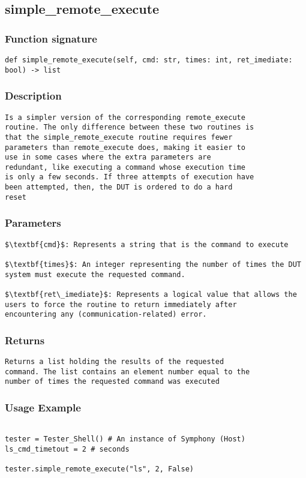 \subsection{simple\_remote\_execute}

\subsubsection{Function signature}
\begin{lstlisting}
def simple_remote_execute(self, cmd: str, times: int, ret_imediate: bool) -> list
\end{lstlisting}

\subsubsection{Description}
\begin{lstlisting}[mathescape=true, keywordstyle=\color{black}, showstringspaces=false]
Is a simpler version of the corresponding remote_execute 
routine. The only difference between these two routines is 
that the simple_remote_execute routine requires fewer 
parameters than remote_execute does, making it easier to 
use in some cases where the extra parameters are 
redundant, like executing a command whose execution time 
is only a few seconds. If three attempts of execution have 
been attempted, then, the DUT is ordered to do a hard 
reset
\end{lstlisting}

\subsubsection{Parameters}
\begin{lstlisting}[mathescape=true, keywordstyle=\color{black}]
$\textbf{cmd}$: Represents a string that is the command to execute

$\textbf{times}$: An integer representing the number of times the DUT 
system must execute the requested command. 

$\textbf{ret\_imediate}$: Represents a logical value that allows the
users to force the routine to return immediately after
encountering any (communication-related) error.

\end{lstlisting}

\subsubsection{Returns}
\begin{lstlisting}[mathescape=true, keywordstyle=\color{black}]
Returns a list holding the results of the requested
command. The list contains an element number equal to the
number of times the requested command was executed
\end{lstlisting}


\subsubsection{Usage Example}
\begin{lstlisting}

tester = Tester_Shell() # An instance of Symphony (Host)
ls_cmd_timetout = 2 # seconds

tester.simple_remote_execute("ls", 2, False)

\end{lstlisting}
